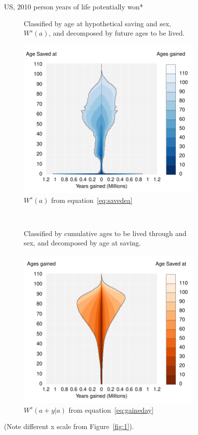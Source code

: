 \documentclass{article}
\begin{document}
\begin{figure}
\centering
\caption{US, 2010 person years of life potentially won*}
\label{fig:2}
\begin{subfigure}[b]{.48\linewidth}
\centering
	\caption{Classified by age at hypothetical saving and sex, $W^s(a)$, and
	decomposed by future ages to be lived.}
	\label{fig:SavedGained}
	\includegraphics[scale=.55]{Figures/YearsSavedGainedxx10.pdf}
	\caption*{$W^s(a)$ from equation~\ref{eq:savedea}}	
\end{subfigure}
~
\begin{subfigure}[b]{.48\linewidth}
\centering
    \caption{Classified by cumulative ages to be lived through and sex, and
    decomposed by age at saving.}
	\label{fig:LostLived}
    \includegraphics[scale=.55]{Figures/YearsLostLivedyx10.pdf}
    \caption*{$W^s(a+y|a)$ from equation~\ref{eq:gaineday}}	
\end{subfigure}
\caption*{(Note different x scale from Figure~\ref{fig:1}).}
\end{figure}
\end{document}
